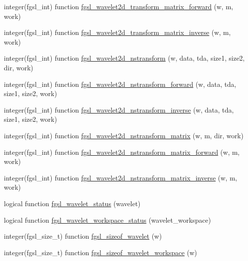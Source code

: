 \begin{DoxyCompactItemize}
\item 
integer(fgsl\-\_\-int) function \hyperlink{wavelet_8finc_a96ce5dd5582a999b163f947e95a1ae40}{fgsl\-\_\-wavelet2d\-\_\-transform\-\_\-matrix\-\_\-forward} (w, m, work)
\item 
integer(fgsl\-\_\-int) function \hyperlink{wavelet_8finc_a9d0bcdfff907e1c19166cddf01fdc15d}{fgsl\-\_\-wavelet2d\-\_\-transform\-\_\-matrix\-\_\-inverse} (w, m, work)
\item 
integer(fgsl\-\_\-int) function \hyperlink{wavelet_8finc_a488377ebb90c0a2cbfddd028be2dc41b}{fgsl\-\_\-wavelet2d\-\_\-nstransform} (w, data, tda, size1, size2, dir, work)
\item 
integer(fgsl\-\_\-int) function \hyperlink{wavelet_8finc_afa1e0433033a7898a4cb3992ac848f88}{fgsl\-\_\-wavelet2d\-\_\-nstransform\-\_\-forward} (w, data, tda, size1, size2, work)
\item 
integer(fgsl\-\_\-int) function \hyperlink{wavelet_8finc_a3424c04dfbf288aebc2d8e5e9164565f}{fgsl\-\_\-wavelet2d\-\_\-nstransform\-\_\-inverse} (w, data, tda, size1, size2, work)
\item 
integer(fgsl\-\_\-int) function \hyperlink{wavelet_8finc_a22dbfeae87b11490a8ecebe3254f85fe}{fgsl\-\_\-wavelet2d\-\_\-nstransform\-\_\-matrix} (w, m, dir, work)
\item 
integer(fgsl\-\_\-int) function \hyperlink{wavelet_8finc_a82cc729239d174d054777ed3b7477260}{fgsl\-\_\-wavelet2d\-\_\-nstransform\-\_\-matrix\-\_\-forward} (w, m, work)
\item 
integer(fgsl\-\_\-int) function \hyperlink{wavelet_8finc_a68e1cc4b337ecb5fef13dbea1b47b33a}{fgsl\-\_\-wavelet2d\-\_\-nstransform\-\_\-matrix\-\_\-inverse} (w, m, work)
\item 
logical function \hyperlink{wavelet_8finc_ae806a3d76e07c7169657aa6541928766}{fgsl\-\_\-wavelet\-\_\-status} (wavelet)
\item 
logical function \hyperlink{wavelet_8finc_abb974e06092a14e00e8d4ad2601c012a}{fgsl\-\_\-wavelet\-\_\-workspace\-\_\-status} (wavelet\-\_\-workspace)
\item 
integer(fgsl\-\_\-size\-\_\-t) function \hyperlink{wavelet_8finc_aa94fb05c91cf6594b1afe524d87ce40e}{fgsl\-\_\-sizeof\-\_\-wavelet} (w)
\item 
integer(fgsl\-\_\-size\-\_\-t) function \hyperlink{wavelet_8finc_a709a83f8f0d23fc64a4933894f474ae1}{fgsl\-\_\-sizeof\-\_\-wavelet\-\_\-workspace} (w)
\end{DoxyCompactItemize}


